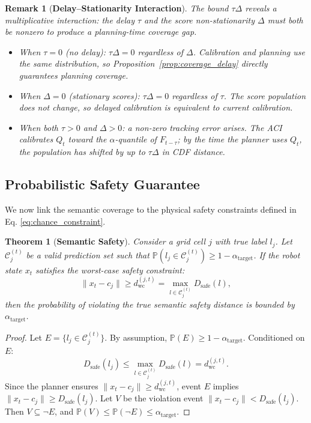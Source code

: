\documentclass[letterpaper, 10 pt, conference]{ieeeconf}  %
\newtheorem{mythm}{\bf Theorem}
\newtheorem{remark}{Remark}
\begin{document}
\begin{remark}[\textbf{Delay--Stationarity Interaction}]
\label{rem:delay_stationarity}
The bound $\tau\Delta$ reveals a multiplicative interaction: the delay $\tau$ and the score non-stationarity $\Delta$ must \emph{both} be nonzero to produce a planning-time coverage gap.
\begin{itemize}
    \item When $\tau = 0$ (no delay): $\tau\Delta = 0$ regardless of $\Delta$. Calibration and planning use the same distribution, so Proposition~\ref{prop:coverage_delay} directly guarantees planning coverage.
    \item When $\Delta = 0$ (stationary scores): $\tau\Delta = 0$ regardless of $\tau$. The score population does not change, so delayed calibration is equivalent to current calibration.
    \item When both $\tau > 0$ and $\Delta > 0$: a non-zero tracking error arises. The ACI calibrates $Q_t$ toward the $\alpha$-quantile of $F_{t-\tau}$; by the time the planner uses $Q_t$, the population has shifted by up to $\tau\Delta$ in CDF distance.
\end{itemize}
\end{remark}

\subsection{Probabilistic Safety Guarantee}
We now link the semantic coverage to the physical safety constraints defined in Eq. \eqref{eq:chance_constraint}.

\begin{mythm}[\textbf{Semantic Safety}]
\label{thm:safety}
Consider a grid cell $j$ with true label $l_j$. Let $\mathcal{C}_j^{(t)}$ be a valid prediction set such that $\mathbb{P}(l_j \in \mathcal{C}_j^{(t)}) \ge 1 - \alpha_{\text{target}}$. If the robot state $x_t$ satisfies the worst-case safety constraint:
\begin{equation}
    \| x_t - c_j \| \ge d_{\text{wc}}^{(j,t)} = \max_{l \in \mathcal{C}_j^{(t)}} D_{\text{safe}}(l),
\end{equation}
then the probability of violating the true semantic safety distance is bounded by $\alpha_{\text{target}}$.
\end{mythm}

\begin{proof}
Let $E = \{ l_j \in \mathcal{C}_j^{(t)} \}$. By assumption, $\mathbb{P}(E) \ge 1 - \alpha_{\text{target}}$.
Conditioned on $E$:
\begin{equation}
    D_{\text{safe}}(l_j) \le \max_{l \in \mathcal{C}_j^{(t)}} D_{\text{safe}}(l) = d_{\text{wc}}^{(j,t)}.
\end{equation}
Since the planner ensures $\| x_t - c_j \| \ge d_{\text{wc}}^{(j,t)}$, event $E$ implies $\| x_t - c_j \| \ge D_{\text{safe}}(l_j)$.
Let $V$ be the violation event $\| x_t - c_j \| < D_{\text{safe}}(l_j)$. Then $V \subseteq \neg E$, and $\mathbb{P}(V) \le \mathbb{P}(\neg E) \le \alpha_{\text{target}}$.
\end{proof}
\end{document}
